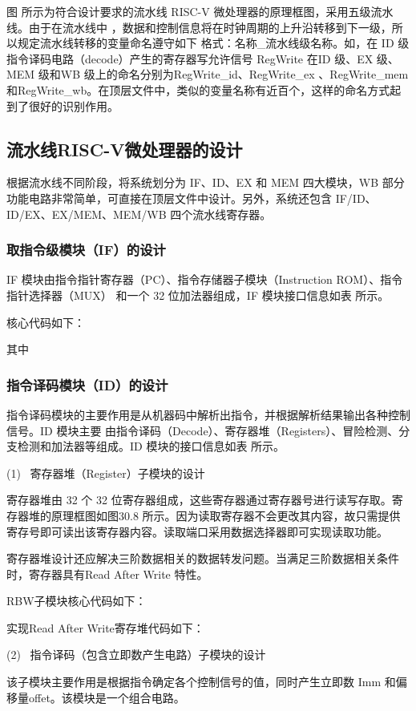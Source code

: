 \documentclass{../source/Experiment}
\begin{document}
图  所示为符合设计要求的流水线 RISC-V 微处理器的原理框图，采用五级流水线。由于在流水线中 ，数据和控制信息将在时钟周期的上升沿转移到下一级，所以规定流水线转移的变量命名遵守如下 格式：名称\_流水线级名称。如，在 ID 级指令译码电路（decode）产生的寄存器写允许信号 RegWrite 在ID 级、EX 级、MEM 级和WB 级上的命名分别为RegWrite\_id、RegWrite\_ex 、RegWrite\_mem 和RegWrite\_wb。在顶层文件中，类似的变量名称有近百个，这样的命名方式起到了很好的识别作用。

\subsection{流水线RISC-V微处理器的设计}
根据流水线不同阶段，将系统划分为 IF、ID、EX 和 MEM 四大模块，WB 部分功能电路非常简单，可直接在顶层文件中设计。另外，系统还包含 IF/ID、ID/EX、EX/MEM、MEM/WB 四个流水线寄存器。
\subsubsection{取指令级模块（IF）的设计}
IF 模块由指令指针寄存器（PC）、指令存储器子模块（Instruction ROM）、指令指针选择器（MUX）
和一个 32 位加法器组成，IF 模块接口信息如表  所示。

核心代码如下：

其中

\subsubsection{指令译码模块（ID）的设计}
指令译码模块的主要作用是从机器码中解析出指令，并根据解析结果输出各种控制信号。ID 模块主要
由指令译码（Decode）、寄存器堆（Registers）、冒险检测、分支检测和加法器等组成。ID 模块的接口信息如表  所示。

(1) \, 寄存器堆（Register）子模块的设计

寄存器堆由 32 个 32 位寄存器组成，这些寄存器通过寄存器号进行读写存取。寄存器堆的原理框图如图30.8 所示。因为读取寄存器不会更改其内容，故只需提供寄存号即可读出该寄存器内容。读取端口采用数据选择器即可实现读取功能。

寄存器堆设计还应解决三阶数据相关的数据转发问题。当满足三阶数据相关条件时，寄存器具有Read After Write 特性。

RBW子模块核心代码如下：

实现Read After Write寄存堆代码如下：

(2) \, 指令译码（包含立即数产生电路）子模块的设计

该子模块主要作用是根据指令确定各个控制信号的值，同时产生立即数 Imm 和偏移量offet。该模块是一个组合电路。
\end{document}
